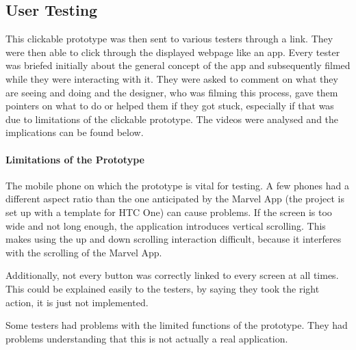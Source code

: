 \documentclass[10pt,twocolumn]{article} %
\begin{document}
\subsection*{User Testing}

This clickable prototype was then sent to various testers through a link. They were then able to click through the displayed webpage like an app. Every tester was briefed initially about the general concept of the app and subsequently filmed while they were interacting with it. They were asked to comment on what they are seeing and doing and the designer, who was filming this process, gave them pointers on what to do or helped them if they got stuck, especially if that was due to limitations of the clickable prototype. The videos were analysed and the implications can be found below.

\paragraph{Limitations of the Prototype}
The mobile phone on which the prototype is vital for testing. A few phones had a different aspect ratio than the one anticipated by the Marvel App (the project is set up with a template for HTC One) can cause problems. If the screen is too wide and not long enough, the application introduces vertical scrolling. This makes using the up and down scrolling interaction difficult, because it interferes with the scrolling of the Marvel App.

Additionally, not every button was correctly linked to every screen at all times. This could be explained easily to the testers, by saying they took the right action, it is just not implemented.

Some testers had problems with the limited functions of the prototype. They had problems understanding that this is not actually a real application.
\end{document}
